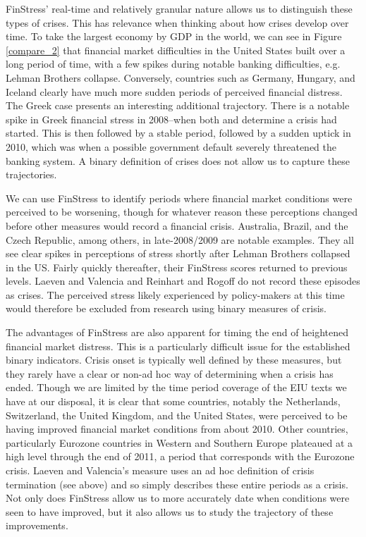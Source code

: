 \documentclass[]{article}
\begin{document}
\noindent FinStress' real-time and relatively granular nature allows us to distinguish these types of crises. This has relevance when thinking about how crises develop over time. To take the largest economy by GDP in the world, we can see in Figure \ref{compare_2} that financial market difficulties in the United States built over a long period of time, with a few spikes during notable banking difficulties, e.g. Lehman Brothers collapse. Conversely, countries such as Germany, Hungary, and Iceland clearly have much more sudden periods of perceived financial distress. The Greek case presents an interesting additional trajectory. There is a notable spike in Greek financial stress in 2008--when both \cite{Reinhart2009} and \cite{laeven2013} determine a crisis had started. This is then followed by a stable period, followed by a sudden uptick in 2010, which was when a possible government default severely threatened the banking system. A binary definition of crises does not allow us to capture these trajectories.

We can use FinStress to identify periods where financial market
conditions were perceived to be worsening, though for whatever reason these perceptions changed before other measures would record a financial crisis. Australia, Brazil, and the Czech Republic, among others, in late-2008/2009 are notable examples. They all see clear spikes in perceptions of stress shortly after Lehman Brothers collapsed in the US. Fairly quickly thereafter, their FinStress scores returned to previous levels. Laeven and Valencia and Reinhart and Rogoff do not record these episodes as crises. The perceived stress likely experienced by policy-makers at this time would therefore be excluded from research using binary measures of crisis.

The advantages of FinStress are also apparent for timing the end of heightened financial market distress. This is a particularly difficult issue for the established binary indicators. Crisis onset is typically well defined by these measures, but they rarely have a clear or non-ad hoc way of determining when a crisis has ended. Though we are limited by the time period coverage of the EIU texts we have at our disposal, it is clear that some countries, notably the Netherlands, Switzerland, the United Kingdom, and the United States, were perceived to be having improved financial market conditions from about 2010. Other countries, particularly Eurozone countries in Western and Southern Europe plateaued at a high level through the end of 2011, a period that corresponds with the Eurozone crisis. Laeven and Valencia's measure uses an ad hoc definition of crisis termination (see above) and so simply describes these entire periods as a crisis. Not only does FinStress allow us to more accurately date when conditions were seen to have improved, but it also allows us to study the trajectory of these improvements.
\end{document}
